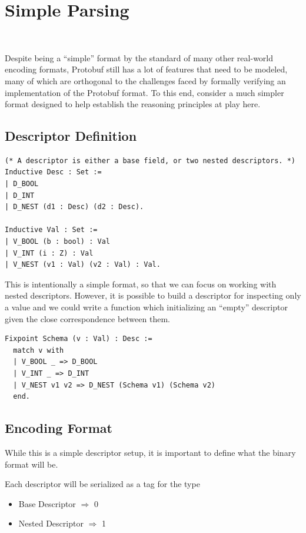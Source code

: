 \section{Simple Parsing}~\label{sec:simpl-parse}

Despite being a ``simple'' format by the standard of many other real-world
encoding formats, Protobuf still has a lot of features that need to be modeled,
many of which are orthogonal to the challenges faced by formally verifying an
implementation of the Protobuf format. To this end, consider a much simpler
format designed to help establish the reasoning principles at play here.

\subsection{Descriptor Definition}

\begin{verbatim}
(* A descriptor is either a base field, or two nested descriptors. *)
Inductive Desc : Set :=
| D_BOOL
| D_INT
| D_NEST (d1 : Desc) (d2 : Desc).

Inductive Val : Set :=
| V_BOOL (b : bool) : Val
| V_INT (i : Z) : Val
| V_NEST (v1 : Val) (v2 : Val) : Val.
\end{verbatim}

This is intentionally a simple format, so that we can focus on working with
nested descriptors. However, it is possible to build a descriptor for inspecting
only a value and we could write a function which initializing an ``empty''
descriptor given the close correspondence between them.

\begin{verbatim}
Fixpoint Schema (v : Val) : Desc :=
  match v with
  | V_BOOL _ => D_BOOL
  | V_INT _ => D_INT
  | V_NEST v1 v2 => D_NEST (Schema v1) (Schema v2)
  end.
\end{verbatim}

\subsection{Encoding Format}

While this is a simple descriptor setup, it is important to define what the
binary format will be.

Each descriptor will be serialized as a tag for the type
\begin{itemize}
\item Base Descriptor $\Rightarrow$ 0
\item Nested Descriptor $\Rightarrow$ 1
\end{itemize}

